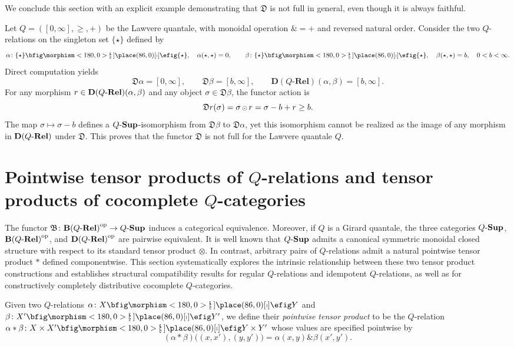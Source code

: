\documentclass{tac}
\begin{document}
We conclude this section with an explicit example demonstrating that $\mathfrak{D}$ is not full in general, even though it is always faithful.

\begin{example} \label{ex:not-full}
Let $Q=([0,\infty],\geq,+)$ be the Lawvere quantale, with monoidal operation $\&=+$ and reversed natural order. Consider the two $Q$-relations on the singleton set $\{\star\}$ defined by
\[
\alpha\colon\sigt\nto\sigt,\quad \alpha(\star,\star)=0,\qquad \beta\colon\sigt\nto\sigt,\quad \beta(\star,\star)=b,\quad 0<b<\infty.
\]
Direct computation yields
\[
\mathfrak{D}\alpha=[0,\infty],\qquad \mathfrak{D}\beta=[b,\infty],\qquad \mathbf{D}(Q\text{-}\mathbf{Rel})(\alpha,\beta)=[b,\infty].
\]
For any morphism $r\in\mathbf{D}(Q\text{-}\mathbf{Rel})(\alpha,\beta)$ and any object $\sigma\in\mathfrak{D}\beta$, the functor action is
\[
\mathfrak{D}r(\sigma)=\sigma{\,{\scriptstyle\odot}\,} r=\sigma-b+r\geq b.
\]
The map $\sigma\mapsto\sigma-b$ defines a ${Q\text{-}\mathbf{Sup}}$-isomorphism from $\mathfrak{D}\beta$ to $\mathfrak{D}\alpha$, yet this isomorphism cannot be realized as the image of any morphism in $\mathbf{D}(Q\text{-}\mathbf{Rel})$ under $\mathfrak{D}$. This proves that the functor $\mathfrak{D}$ is not full for the Lawvere quantale $Q$.
\end{example}

    
\section{Pointwise tensor products of $Q$-relations and tensor products of cocomplete $Q$-categories}
 The functor $\mathfrak{B}\colon{\mathbf{B}(Q\text{-}\mathbf{Rel})}^{\mathrm{op}}\to{Q\text{-}\mathbf{Sup}}$ induces a categorical equivalence. Moreover, if $Q$ is a Girard quantale, the three categories ${Q\text{-}\mathbf{Sup}}$, ${\mathbf{B}(Q\text{-}\mathbf{Rel})}^{\mathrm{op}}$, and ${\mathbf{D}(Q\text{-}\mathbf{Rel})}^{\mathrm{op}}$ are pairwise equivalent. It is well known that ${Q\text{-}\mathbf{Sup}}$ admits a canonical symmetric monoidal closed structure with respect to its standard tensor product $\otimes$. In contrast, arbitrary pairs of $Q$-relations admit a natural pointwise tensor product $*$ defined componentwise. This section systematically explores the intrinsic relationship between these two tensor product constructions and establishes structural compatibility results for regular $Q$-relations and idempotent $Q$-relations, as well as for constructively completely distributive cocomplete $Q$-categories.

Given two $Q$-relations $\alpha\colon X\nto Y$ and $\beta\colon X'\nto Y'$, we define their \emph{pointwise tensor product} to be the $Q$-relation $\alpha*\beta\colon X\times X'\nto Y\times Y'$ whose values are specified pointwise by
\[
(\alpha*\beta)\bigl((x,x'),(y,y')\bigr)
=\alpha(x,y)\mathbin{\&}\beta(x',y').
\]
\end{document}
